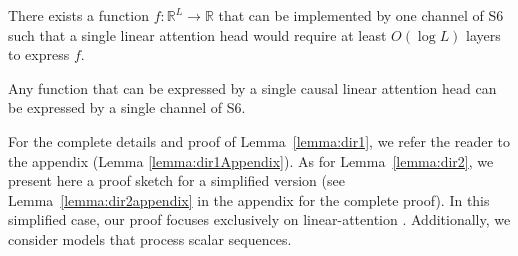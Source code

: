 

\begin{lemma}\label{lemma:dir2}
There exists a function \( f : \mathbb{R}^L \rightarrow \mathbb{R} \) that can be implemented by one channel of S6 such that a single {\color{black}linear} attention head would require at least  \( O(\log L) \) layers to express $f$.%
\end{lemma}

\begin{lemma}\label{lemma:dir1}
Any function that can be expressed by a single {\color{black}causal linear} attention head can %
be expressed by a single channel of S6.
\end{lemma}

For the complete details and proof of Lemma~\ref{lemma:dir1}, we refer the reader to the appendix (Lemma \ref{lemma:dir1Appendix}). As for Lemma~\ref{lemma:dir2}, we present here a proof sketch for a simplified version (see Lemma~\ref{lemma:dir2appendix}
in the appendix for the complete proof). In this simplified case, our proof focuses exclusively on linear-attention%
. Additionally, we consider models that process scalar sequences. 

